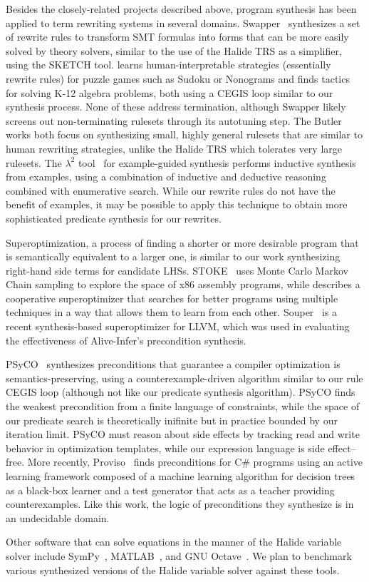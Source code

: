 Besides the closely-related projects described above, program synthesis has been applied to term rewriting systems in several domains. Swapper~\citep{singh2016swapper} synthesizes a set of rewrite rules to transform SMT formulas into forms that can be more easily solved by theory solvers, similar to the use of the Halide TRS as a simplifier, using the SKETCH tool. \citep{butler2017synthesizing} learns human-interpretable strategies (essentially rewrite rules) for puzzle games such as Sudoku or Nonograms and \citep{butler2018framework} finds tactics for solving K-12 algebra problems, both using a CEGIS loop similar to our synthesis process. None of these address termination, although Swapper likely screens out non-terminating rulesets through its autotuning step. The Butler works both focus on synthesizing small, highly general rulesets that are similar to human rewriting strategies, unlike the Halide TRS which tolerates very large rulesets.  The \textbf{$\lambda^2$} tool~\citep{feser2015lambda} for example-guided synthesis performs inductive synthesis from examples, using a combination of inductive and deductive reasoning combined with enumerative search.  While our rewrite rules do not have the benefit of examples, it may be possible to apply this technique to obtain more sophisticated predicate synthesis for our rewrites.

Superoptimization, a process of finding a shorter or more desirable program that is semantically equivalent to a larger one, is similar to our work synthesizing right-hand side terms for candidate LHSs. STOKE~\citep{schkufza2013stochastic} uses Monte Carlo Markov Chain sampling to explore the space of x86 assembly programs, while \citep{phothilimthana2016scaling} describes a cooperative superoptimizer that searches for better programs using multiple techniques in a way that allows them to learn from each other.  Souper~\citep{sasnauskas2017souper} is a recent synthesis-based superoptimizer for LLVM, which was used in evaluating the effectiveness of Alive-Infer's{} precondition synthesis.

PSyCO~\citep{lopes2014weakest} synthesizes preconditions that guarantee a compiler optimization is semantics-preserving, using a counterexample-driven algorithm similar to our rule CEGIS loop (although not like our predicate synthesis algorithm). PSyCO finds the weakest precondition from a finite language of constraints, while the space of our predicate search is theoretically inifinite but in practice bounded by our iteration limit. PSyCO must reason about side effects by tracking read and write behavior in optimization templates, while our expression language is side effect--free. More recently, Proviso~\citep{astorga2019learning} finds preconditions for C\# programs using an active learning framework composed of a machine learning algorithm for decision trees as a black-box learner and a test generator that acts as a teacher providing counterexamples. Like this work, the logic of preconditions they synthesize is in an undecidable domain.

Other software that can solve equations in the manner of the Halide variable solver include SymPy~\citep{10.7717/peerj-cs.103}, MATLAB~\citep{higham2016matlab}, and GNU Octave~\citep{eaton1997gnu}. We plan to benchmark various synthesized versions of the Halide variable solver against these tools. 